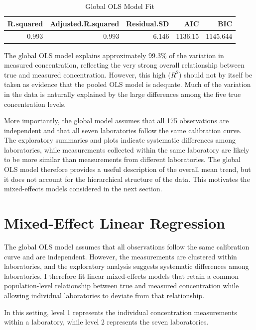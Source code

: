 \documentclass[
]{article}
\begin{document}
\begin{table}[!h]
\centering
\caption{\label{tab:OLS summary}Global OLS Model Fit}
\centering
\begin{tabular}[t]{rrrrr}
\toprule
R.squared & Adjusted.R.squared & Residual.SD & AIC & BIC\\
\midrule
0.993 & 0.993 & 6.146 & 1136.15 & 1145.644\\
\bottomrule
\end{tabular}
\end{table}

The global OLS model explains approximately 99.3\% of the variation in
measured concentration, reflecting the very strong overall relationship
between true and measured concentration. However, this high (\(R^2\))
should not by itself be taken as evidence that the pooled OLS model is
adequate. Much of the variation in the data is naturally explained by
the large differences among the five true concentration levels.

More importantly, the global model assumes that all 175 observations are
independent and that all seven laboratories follow the same calibration
curve. The exploratory summaries and plots indicate systematic
differences among laboratories, while measurements collected within the
same laboratory are likely to be more similar than measurements from
different laboratories. The global OLS model therefore provides a useful
description of the overall mean trend, but it does not account for the
hierarchical structure of the data. This motivates the mixed-effects
models considered in the next section.

\section{Mixed-Effect Linear
Regression}\label{mixed-effect-linear-regression}

The global OLS model assumes that all observations follow the same
calibration curve and are independent. However, the measurements are
clustered within laboratories, and the exploratory analysis suggests
systematic differences among laboratories. I therefore fit linear
mixed-effects models that retain a common population-level relationship
between true and measured concentration while allowing individual
laboratories to deviate from that relationship.

In this setting, level 1 represents the individual concentration
measurements within a laboratory, while level 2 represents the seven
laboratories.
\end{document}
